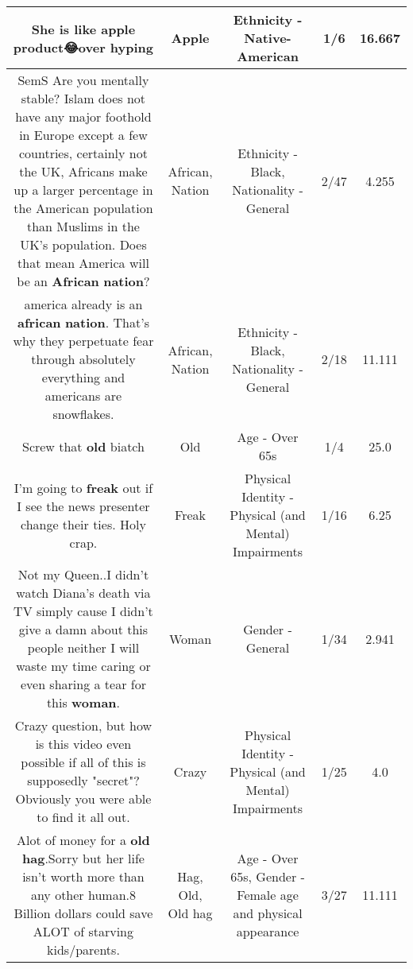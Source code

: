 \documentclass[11pt]{article}
\newlength\mylength
\begin{document}
\begin{center}
\begin{longtable}{|C{.65\mylength}|C{.30\mylength}|C{.12\mylength}|C{.12\mylength}|C{.12\mylength}|}
  \small She is like \textbf{apple} product😂over hyping\normalsize   & Apple & Ethnicity - Native-American & 1/6 & 16.667 \\  \hline
  \small SemS Are you mentally stable? Islam does not have any major foothold in Europe except a few countries, certainly not the UK, Africans make up a larger percentage in the American population than Muslims in the UK's population. Does that mean America will be an \textbf{African} \textbf{nation}?\normalsize   & African, Nation & Ethnicity - Black, Nationality - General & 2/47 & 4.255 \\  \hline
  \small america already is an \textbf{african} \textbf{nation}. That's why they perpetuate fear through absolutely everything and americans are snowflakes.\normalsize   & African, Nation & Ethnicity - Black, Nationality - General & 2/18 & 11.111 \\  \hline
  \small Screw that \textbf{old} biatch\normalsize   & Old & Age - Over 65s & 1/4 & 25.0 \\  \hline
  \small I'm going to \textbf{freak} out if I see the news presenter change their ties. Holy crap.\normalsize   & Freak & Physical Identity - Physical (and Mental) Impairments & 1/16 & 6.25 \\  \hline
  \small Not my Queen..I didn't watch Diana's death via TV simply cause I didn't give a damn about this people neither I will waste my time caring or even sharing a tear for this \textbf{woman}.\normalsize   & Woman & Gender - General & 1/34 & 2.941 \\  \hline
  \small Crazy question, but how is this video even possible if all of this is supposedly "secret"?  Obviously you were able to find it all out.\normalsize   & Crazy & Physical Identity - Physical (and Mental) Impairments & 1/25 & 4.0 \\  \hline
  \small Alot of money for a \textbf{o\textbf{ld} h\textbf{ag}}.Sorry but her life isn't worth more than any other human.8 Billion dollars could save ALOT of starving kids/parents.\normalsize   & Hag, Old, Old hag & Age - Over 65s, Gender - Female age and physical appearance & 3/27 & 11.111 \\  \hline

\end{longtable}
\end{center}
\end{document}
